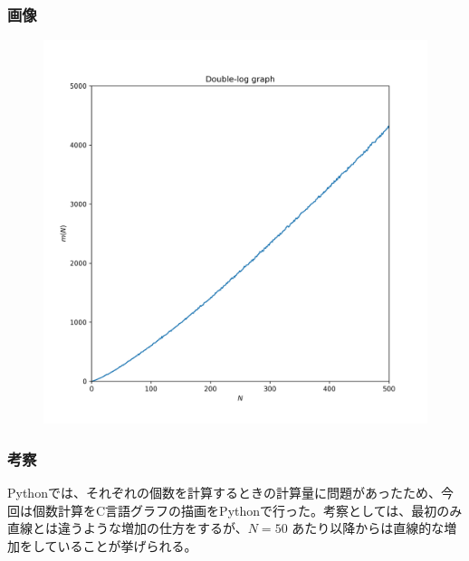 \subsubsection{画像}
\begin{figure}[htbp]
  \centering
  \includegraphics[keepaspectratio, scale=0.5]{images/Problem9/task9.png}
\end{figure}

\subsubsection{考察}
Pythonでは、それぞれの個数を計算するときの計算量に問題があったため、今回は個数計算をC言語グラフの描画をPythonで行った。考察としては、最初のみ直線とは違うような増加の仕方をするが、$N = 50$ あたり以降からは直線的な増加をしていることが挙げられる。


